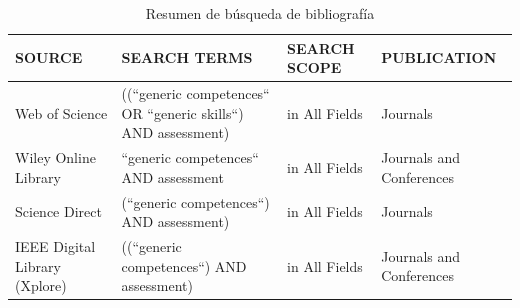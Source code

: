 \begin{table}
  \begin{center}
  \begin{tabular}{| p{3cm} | p{5cm} | p{2cm} | p{3cm} |}
    \hline
    SOURCE & SEARCH TERMS & SEARCH SCOPE & PUBLICATION\\
    \hline
    \hline
    Web of Science & ((``generic competences`` OR ``generic skills``) AND assessment) & in All Fields & Journals\\
    \hline
    Wiley Online Library & ``generic competences`` AND assessment & in All Fields & Journals and Conferences\\
    \hline
    Science Direct & (``generic competences``) AND assessment) & in All Fields & Journals\\
    \hline
    IEEE Digital Library (Xplore) & ((``generic competences``) AND assessment) & in All Fields & Journals and Conferences\\
    \hline

    \hline
  \end{tabular}
\end{center}
\caption{Resumen de búsqueda de bibliografía}
\label{tab:ResumenBusqueda}
\end{table} 

